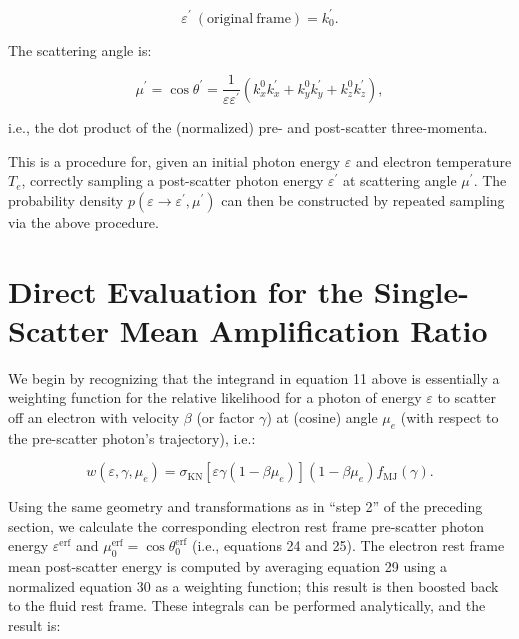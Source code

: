 \documentclass[letterpaper]{article}
\begin{document}
\begin{enumerate}
\begin{equation}
\varepsilon^\prime\ \mathrm{(original\ frame)} = k^\prime_0.
\end{equation}

\noindent The scattering angle is:

\begin{equation}
\mu^\prime = \cos \theta^\prime = \frac{1}{\varepsilon \varepsilon^\prime} (k^0_x k^\prime_x + k^0_y k^\prime_y + k^0_z k^\prime_z), 
\end{equation}

\noindent i.e., the dot product of the (normalized) pre- and post-scatter three-momenta.

\end{enumerate}

This is a procedure for, given an initial photon energy $\varepsilon$ and electron temperature $T_e$, correctly sampling a post-scatter photon energy $\varepsilon^\prime$ at scattering angle $\mu^\prime$. The probability density $p(\varepsilon \to \varepsilon^\prime, \mu^\prime)$ can then be constructed by repeated sampling via the above procedure.

\section*{Direct Evaluation for the Single-Scatter Mean Amplification Ratio}

We begin by recognizing that the integrand in equation 11 above is essentially a weighting function for the relative likelihood for a photon of energy $\varepsilon$ to scatter off an electron with velocity $\beta$ (or factor $\gamma$) at (cosine) angle $\mu_e$ (with respect to the pre-scatter photon's trajectory), i.e.:

\begin{equation}
w\left(\varepsilon, \gamma, \mu_e\right) = \sigma_\mathrm{KN} \left[ \varepsilon \gamma (1 - \beta \mu_e ) \right] (1 - \beta \mu_e) f_\mathrm{MJ} (\gamma).
\end{equation}

\noindent Using the same geometry and transformations as in ``step 2'' of the preceding section, we calculate the corresponding electron rest frame pre-scatter photon energy $\varepsilon^\mathrm{erf}$ and $\mu_0^\mathrm{erf} = \cos \theta_0^\mathrm{erf}$ (i.e., equations 24 and 25). The electron rest frame mean post-scatter energy is computed by averaging equation 29 using a normalized equation 30 as a weighting function; this result is then boosted back to the fluid rest frame. These integrals can be performed analytically, and the result is:
\end{document}
